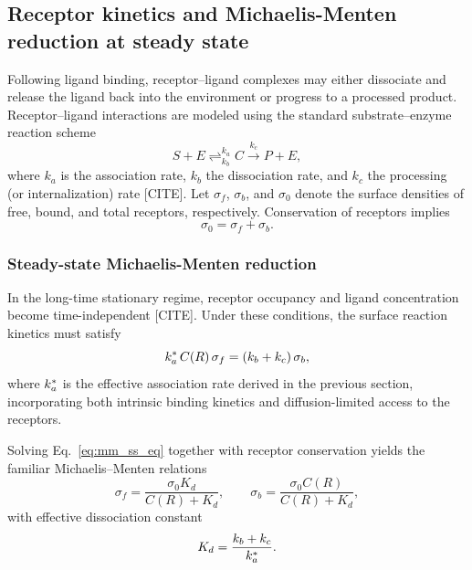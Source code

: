 \subsection{Receptor kinetics and Michaelis-Menten reduction at steady state}\label{sec:mm_reduction}
Following ligand binding, receptor--ligand complexes may either dissociate and release the ligand back into the environment or progress to a processed product. Receptor--ligand interactions are modeled using the standard substrate--enzyme reaction scheme
\begin{equation}
    S + E \mathrel{\mathop{\rightleftharpoons}^{k_a}_{k_b}} C \xrightarrow{k_c} P + E,
    \label{eq:mm_scheme}
\end{equation}
where $k_a$ is the association rate, $k_b$ the dissociation rate, and $k_c$ the processing (or internalization) rate [CITE].
Let $\sigma_f$, $\sigma_b$, and $\sigma_0$ denote the surface densities of free, bound, and total receptors, respectively.
Conservation of receptors implies
\begin{equation}
    \sigma_0 = \sigma_f + \sigma_b.
    \label{eq:receptor_conservation}
\end{equation}

\subsubsection{Steady-state Michaelis-Menten reduction}\label{sec:mm_ss}

In the long-time stationary regime, receptor occupancy and ligand concentration become time-independent [CITE]. Under these conditions, the surface reaction kinetics must satisfy
\begin{equation}
    k_a^{*} \, C(R) \, \sigma_f = (k_b + k_c) \, \sigma_b,
    \label{eq:mm_ss_eq}
\end{equation}
where $k_a^{*}$ is the effective association rate derived in the previous section, incorporating both intrinsic binding kinetics and diffusion-limited access to the receptors.

Solving Eq.~\eqref{eq:mm_ss_eq} together with receptor conservation yields the familiar Michaelis--Menten relations
\begin{equation}
    \sigma_f = \frac{\sigma_0 K_d}{C(R) + K_d}, \qquad \sigma_b = \frac{\sigma_0 C(R)}{C(R) + K_d},
    \label{eq:mm_relations}
\end{equation}
with effective dissociation constant
\begin{equation}
    K_d = \frac{k_b + k_c}{k_a^{*}}.
    \label{eq:Kd_eff}
\end{equation}

